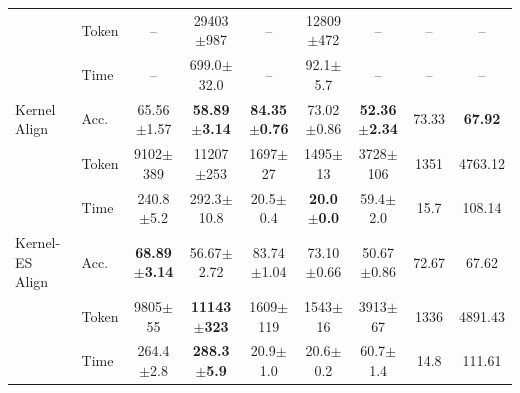 \documentclass{article} %
\begin{document}
\begin{table}[t]
{{\begin{tabular}{@{}ll*{7}{c}@{}}
 & Token & -- & 29403$\pm$987 & -- & 12809$\pm$472 & -- & -- & -- \\
 & Time & -- & 699.0$\pm$32.0 & -- & 92.1$\pm$5.7 & -- & -- & -- \\
\midrule
Kernel Align & Acc. & 65.56$\pm$1.57 & \textbf{58.89$\pm$3.14} & \textbf{84.35$\pm$0.76} & 73.02$\pm$0.86 & \textbf{52.36$\pm$2.34} & 73.33 & \textbf{67.92} \\
 & Token & 9102$\pm$389 & 11207$\pm$253 & 1697$\pm$27 & 1495$\pm$13 & 3728$\pm$106 & 1351 & 4763.12 \\
 & Time & 240.8$\pm$5.2 & 292.3$\pm$10.8 & 20.5$\pm$0.4 & \textbf{20.0$\pm$0.0} & 59.4$\pm$2.0 & 15.7 & 108.14 \\
\midrule
Kernel-ES Align & Acc. & \textbf{68.89$\pm$3.14} & 56.67$\pm$2.72 & 83.74$\pm$1.04 & 73.10$\pm$0.66 & 50.67$\pm$0.86 & 72.67 & 67.62 \\
 & Token & 9805$\pm$55 & \textbf{11143$\pm$323} & 1609$\pm$119 & 1543$\pm$16 & 3913$\pm$67 & 1336 & 4891.43 \\
 & Time & 264.4$\pm$2.8 & \textbf{288.3$\pm$5.9} & 20.9$\pm$1.0 & 20.6$\pm$0.2 & 60.7$\pm$1.4 & 14.8 & 111.61 \\
\bottomrule
\end{tabular}%
}%
}
\end{table}
\end{document}
